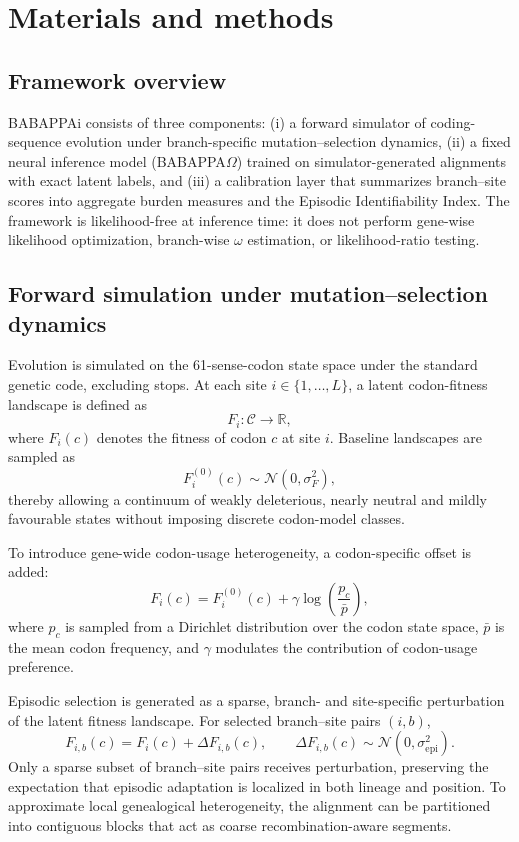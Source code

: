 \documentclass[11pt]{article}
\begin{document}
\section{Materials and methods}

\subsection{Framework overview}

BABAPPAi consists of three components: (i) a forward simulator of coding-sequence evolution under branch-specific mutation--selection dynamics, (ii) a fixed neural inference model (BABAPPA$\Omega$) trained on simulator-generated alignments with exact latent labels, and (iii) a calibration layer that summarizes branch--site scores into aggregate burden measures and the Episodic Identifiability Index. The framework is likelihood-free at inference time: it does not perform gene-wise likelihood optimization, branch-wise $\omega$ estimation, or likelihood-ratio testing.

\subsection{Forward simulation under mutation--selection dynamics}

Evolution is simulated on the 61-sense-codon state space under the standard genetic code, excluding stops. At each site $i \in \{1,\ldots,L\}$, a latent codon-fitness landscape is defined as
\[
F_i:\mathcal{C}\rightarrow \mathbb{R},
\]
where $F_i(c)$ denotes the fitness of codon $c$ at site $i$. Baseline landscapes are sampled as
\[
F_i^{(0)}(c)\sim \mathcal{N}(0,\sigma_F^2),
\]
thereby allowing a continuum of weakly deleterious, nearly neutral and mildly favourable states without imposing discrete codon-model classes.

To introduce gene-wide codon-usage heterogeneity, a codon-specific offset is added:
\[
F_i(c)=F_i^{(0)}(c)+\gamma \log\!\left(\frac{p_c}{\bar p}\right),
\]
where $p_c$ is sampled from a Dirichlet distribution over the codon state space, $\bar p$ is the mean codon frequency, and $\gamma$ modulates the contribution of codon-usage preference.

Episodic selection is generated as a sparse, branch- and site-specific perturbation of the latent fitness landscape. For selected branch--site pairs $(i,b)$,
\[
F_{i,b}(c)=F_i(c)+\Delta F_{i,b}(c),
\qquad
\Delta F_{i,b}(c)\sim \mathcal{N}(0,\sigma_{\mathrm{epi}}^2).
\]
Only a sparse subset of branch--site pairs receives perturbation, preserving the expectation that episodic adaptation is localized in both lineage and position. To approximate local genealogical heterogeneity, the alignment can be partitioned into contiguous blocks that act as coarse recombination-aware segments.
\end{document}
